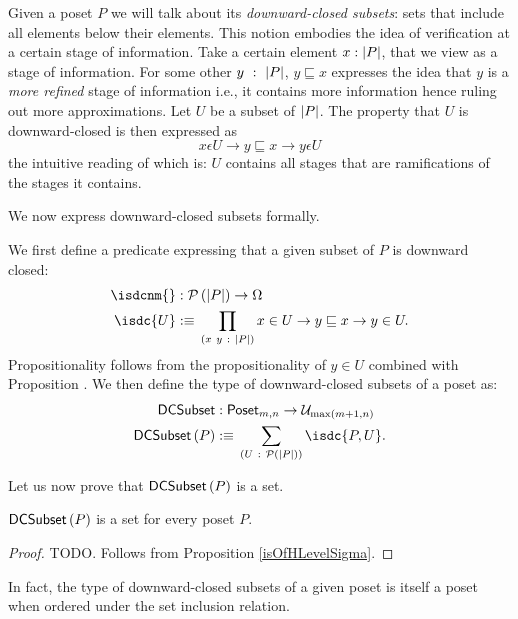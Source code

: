 Given a poset $P$ we will talk about its \emph{downward-closed subsets}: sets that include
all elements below their elements. This notion embodies the idea of verification at a
certain stage of information. Take a certain element $x : \left| P \right|$, that we view as a
stage of information. For some other $y~:~\left| P \right|$, $y \sqsubseteq x$ expresses the idea that $y$ is
a \emph{more refined} stage of information i.e., it contains more information hence ruling
out more approximations. Let $U$ be a subset of $\left| P \right|$. The property that $U$ is
downward-closed is then expressed as
\begin{equation*}
  x \epsilon U \rightarrow y \sqsubseteq x \rightarrow y \epsilon U
\end{equation*}
the intuitive reading of which is: $U$ contains all stages that are ramifications of the
stages it contains.

We now express downward-closed subsets formally.
\begin{defn}\label{defn:dc-subset}
  We first define a predicate expressing that a given subset of $P$ is downward closed:
  \begin{align*}
    \isdcnm{} &:  \pow{\abs{P}} \rightarrow \Omega\\
    \isdc{U}  &\is{} \pity{x~y}{\abs{P}}{x \in U \rightarrow y \sqsubseteq x \rightarrow y \in U}.
  \end{align*}
  Propositionality follows from the propositionality of $y \in U$ combined with
  Proposition \label{prop:pi-prop}. We then define the type of downward-closed subsets of
  a poset as:
  \begin{align*}
    \dcsubsetnm{} &: \mathsf{Poset}_{m, n} \rightarrow \univ_{\max(m+1, n)}\\
    \dcsubset{P}  &\is{} \sigmaty{U}{\pow{\abs{P}}}{\isdc{P, U}}.
  \end{align*}
\end{defn}

Let us now prove that $\mathsf{DCSubset}{}\left(P\right)$ is a set.
\begin{prop}\label{isSetDCSubset}
  $\mathsf{DCSubset}{}\left(P\right)$ is a set for every poset $P$.
\end{prop}
\begin{proof}
  TODO.
  Follows from Proposition \ref{isOfHLevelSigma}.
\end{proof}

In fact, the type of downward-closed subsets of a given poset is itself a poset
when ordered under the set inclusion relation.

